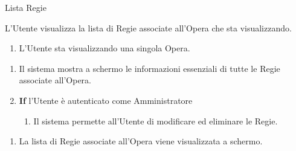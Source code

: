{\ucTable	%
	{	%
		Lista Regie
		
	}{	%
		
	}{	%
		L'Utente visualizza la lista di Regie associate all'Opera che sta visualizzando.
		
	}{	%
		\attori
	}{	%
		\begin{enumerate}
			\item L'Utente sta visualizzando una singola Opera.
		\end{enumerate}
		
	}{	%
		\begin{enumerate}
			\item Il sistema mostra a schermo le informazioni essenziali di tutte le Regie associate all'Opera.
            \item \textbf{If} l'Utente è autenticato come Amministratore
            \begin{enumerate}
                \item Il sistema permette all'Utente di modificare ed eliminare le Regie.
            \end{enumerate}
		\end{enumerate}
		
	}{	%
		\begin{enumerate}
			\item La lista di Regie associate all'Opera viene visualizzata a schermo.
		\end{enumerate}
		
	}{	%
} }


